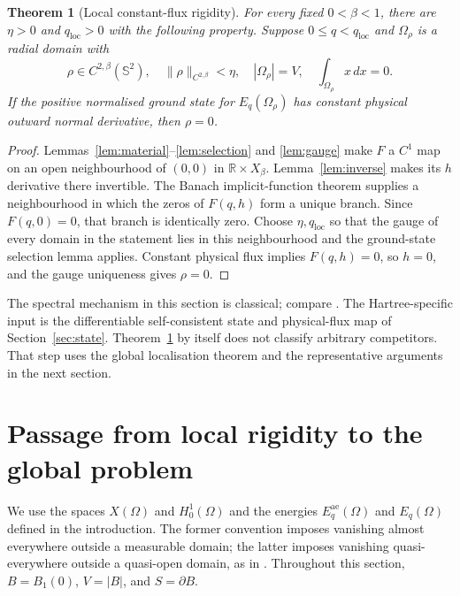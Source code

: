 \documentclass[11pt,a4paper]{article}
\newtheorem{theorem}{Theorem}[section]
\theoremstyle{definition}
\theoremstyle{remark}
\begin{document}
\begin{theorem}[Local constant-flux rigidity]\label{thm:local}
For every fixed $0<\beta<1$, there are $\eta>0$ and $q_{\mathrm{loc}}>0$ with the following property. Suppose $0\leq q<q_{\mathrm{loc}}$ and $\Omega_\rho$ is a radial domain with
\[
 \rho\in C^{2,\beta}(\mathbb S^2),\quad
 \|\rho\|_{C^{2,\beta}}<\eta,\quad
 |\Omega_\rho|=V,\quad \int_{\Omega_\rho}x\,dx=0.
\]
If the positive normalised ground state for $E_q(\Omega_\rho)$ has constant physical outward normal derivative, then $\rho=0$.
\end{theorem}
\begin{proof}
Lemmas~\ref{lem:material}--\ref{lem:selection} and \ref{lem:gauge} make $F$ a $C^1$ map on an open neighbourhood of $(0,0)$ in $\mathbb R\times X_\beta$. Lemma~\ref{lem:inverse} makes its $h$ derivative there invertible. The Banach implicit-function theorem supplies a neighbourhood in which the zeros of $F(q,h)$ form a unique branch. Since $F(q,0)=0$, that branch is identically zero. Choose $\eta,q_{\mathrm{loc}}$ so that the gauge of every domain in the statement lies in this neighbourhood and the ground-state selection lemma applies. Constant physical flux implies $F(q,h)=0$, so $h=0$, and the gauge uniqueness gives $\rho=0$.
\end{proof}

The spectral mechanism in this section is classical; compare \cite[Propositions 3.2, 4.2--4.3 and Section 5]{PacardSicbaldi2009}. The Hartree-specific input is the differentiable self-consistent state and physical-flux map of Section~\ref{sec:state}. Theorem~\ref{thm:local} by itself does not classify arbitrary competitors. That step uses the global localisation theorem and the representative arguments in the next section.

\section{Passage from local rigidity to the global problem}
\label{sec:global}

We use the spaces $X(\Omega)$ and $H^1_0(\Omega)$ and the energies
$E_q^{\mathrm{ae}}(\Omega)$ and $E_q(\Omega)$ defined in the introduction.
The former convention imposes vanishing almost everywhere outside a
measurable domain; the latter imposes vanishing quasi-everywhere outside
a quasi-open domain, as in \cite[Section~2.3, pp.~1037--1038]{MMR2025}.
Throughout this section, $B=B_1(0)$, $V=|B|$, and $S=\partial B$.
\end{document}
